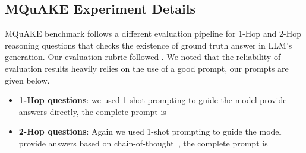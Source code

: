 \subsection{MQuAKE Experiment Details}


MQuAKE benchmark follows a different evaluation pipeline for 1-Hop and 2-Hop reasoning questions \citep{zhong2023mquake,wang2024deepedit} that checks the existence of ground truth answer in LLM's generation.
Our evaluation rubric followed \citet{zhong2023mquake}. 
We noted that the reliability of evaluation results heavily relies on the use of a good prompt, our prompts are given below.

\begin{itemize}
\item \textbf{1-Hop questions}:  we used 1-shot prompting to guide the model provide answers directly, the complete prompt is 

\noindent{}

\item \textbf{2-Hop questions}:  Again we used 1-shot prompting to guide the model provide answers based on chain-of-thought~\citep{wei2022chain}, the complete prompt is 


\noindent{}
\end{itemize}
